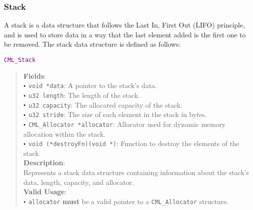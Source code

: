 \documentclass[a4paper,oneside,10pt]{article}
\newcommand{\struct}[1]{
  \noindent\textcolor{purple}{\texttt{#1}}
  \vspace{-0.3em}
}
\renewcommand{\dot}{\raisebox{0.3ex}{\scalebox{0.6}{$\bullet$}}}
\theoremstyle{definition}
\begin{document}
\subsubsection{Stack}

A stack is a data structure that follows the Last In, First Out (LIFO) principle, and is used to store data in a way that the last element added is the first one to be removed. The stack data structure is defined as follows: \newline

\struct{CML\_Stack}
\begin{quote}
  \textbf{Fields}: \\
  $\dot$ \texttt{void *data}: A pointer to the stack's data. \\
  $\dot$ \texttt{u32 length}: The length of the stack. \\
  $\dot$ \texttt{u32 capacity}: The allocated capacity of the stack. \\
  $\dot$ \texttt{u32 stride}: The size of each element in the stack in bytes. \\
  $\dot$ \texttt{CML\_Allocator *allocator}: Allocator used for dynamic memory allocation within the stack. \\
  $\dot$ \texttt{void (*destroyFn)(void *)}: Function to destroy the elements of the stack. \\
  
  \vspace{-0.75em}
  \textbf{Description}: \\
  Represents a stack data structure containing information about the stack's data, length, capacity, and allocator. \\

  \vspace{-0.75em}
  \textbf{Valid Usage}: \\
  $\dot$ \texttt{allocator} \textbf{must} be a valid pointer to a \texttt{CML\_Allocator} structure. \\
\end{quote}
\end{document}
